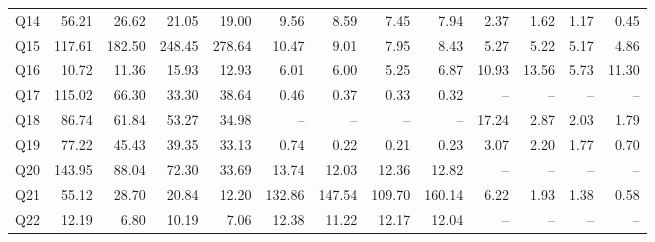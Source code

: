 \begin{table}[H]
\begin{tabular}{l*{12}{r}}
Q14 & 56.21 & 26.62 & 21.05 & 19.00 & 9.56 & 8.59 & 7.45 & 7.94 & 2.37 & 1.62 & 1.17 & 0.45 \\
Q15 & 117.61 & 182.50 & 248.45 & 278.64 & 10.47 & 9.01 & 7.95 & 8.43 & 5.27 & 5.22 & 5.17 & 4.86 \\
Q16 & 10.72 & 11.36 & 15.93 & 12.93 & 6.01 & 6.00 & 5.25 & 6.87 & 10.93 & 13.56 & 5.73 & 11.30 \\
Q17 & 115.02 & 66.30 & 33.30 & 38.64 & 0.46 & 0.37 & 0.33 & 0.32 & -- & -- & -- & -- \\
Q18 & 86.74 & 61.84 & 53.27 & 34.98 & -- & -- & -- & -- & 17.24 & 2.87 & 2.03 & 1.79 \\
Q19 & 77.22 & 45.43 & 39.35 & 33.13 & 0.74 & 0.22 & 0.21 & 0.23 & 3.07 & 2.20 & 1.77 & 0.70 \\
Q20 & 143.95 & 88.04 & 72.30 & 33.69 & 13.74 & 12.03 & 12.36 & 12.82 & -- & -- & -- & -- \\
Q21 & 55.12 & 28.70 & 20.84 & 12.20 & 132.86 & 147.54 & 109.70 & 160.14 & 6.22 & 1.93 & 1.38 & 0.58 \\
Q22 & 12.19 & 6.80 & 10.19 & 7.06 & 12.38 & 11.22 & 12.17 & 12.04 & -- & -- & -- & -- \\
\bottomrule
\end{tabular}
\end{table}